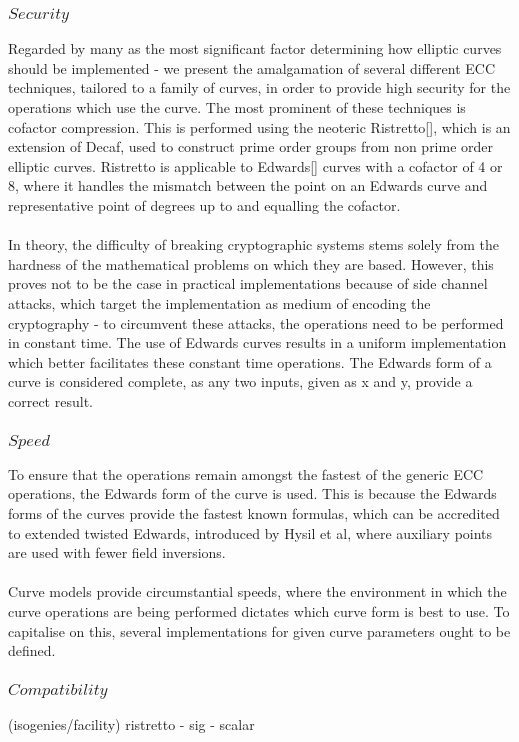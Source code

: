 \documentclass{article}
\begin{document}
\subsubsection{$Security$}  Regarded by many as the most significant factor determining how elliptic curves should be implemented - we present the amalgamation of several different ECC techniques, tailored to a family of curves, in order to provide high security for the operations which use the curve. The most prominent of these techniques is cofactor compression. This is performed using the neoteric Ristretto[], which is an extension of Decaf, used to construct prime order groups from non prime order elliptic curves. Ristretto is applicable to Edwards[] curves with a cofactor of 4 or 8, where it handles the mismatch between the point on an Edwards curve and representative point of degrees up to and equalling the cofactor. \\\\
 In theory, the difficulty of breaking cryptographic systems stems solely from the hardness of the mathematical problems on which they are based. However, this proves not to be the case in practical implementations because of side channel attacks, which target the implementation as medium of encoding the cryptography - to circumvent these attacks, the operations need to be performed in constant time. The use of Edwards curves results in a uniform implementation which better facilitates these constant time operations. The Edwards form of a curve is considered complete, as any two inputs, given as x and y, provide a correct result.   
\subsubsection{$Speed$} To ensure that the operations remain amongst the fastest of the generic ECC operations, the Edwards form of the curve is used. This is because the Edwards forms of the curves provide the fastest known formulas, which can be accredited to extended twisted Edwards, introduced by Hysil et al, where auxiliary points are used with fewer field inversions. \\\\
Curve models provide circumstantial speeds, where the environment in which the curve operations are being performed dictates which curve form is best to use. To capitalise on this, several implementations for given curve parameters ought to be defined. 
\subsubsection{$Compatibility$} (isogenies/facility) ristretto - sig - scalar
\end{document}
